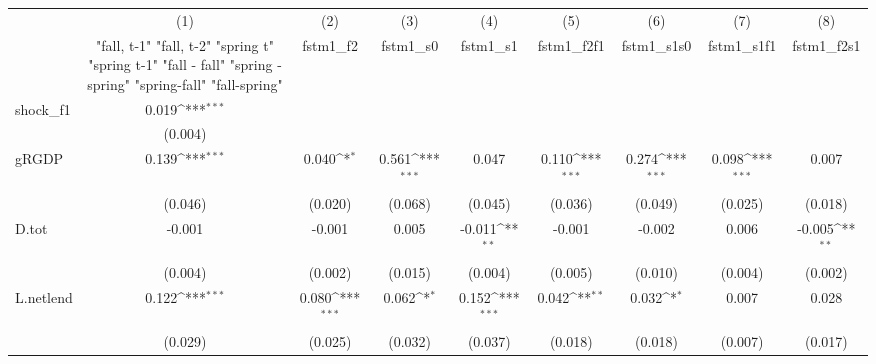 {
\def\sym#1{\ifmmode^{#1}\else\(^{#1}\)\fi}
\begin{tabular}{l*{8}{c}}
\toprule
            &\multicolumn{1}{c}{(1)}&\multicolumn{1}{c}{(2)}&\multicolumn{1}{c}{(3)}&\multicolumn{1}{c}{(4)}&\multicolumn{1}{c}{(5)}&\multicolumn{1}{c}{(6)}&\multicolumn{1}{c}{(7)}&\multicolumn{1}{c}{(8)}\\
            &\multicolumn{1}{c}{  "fall, t-1" "fall, t-2" "spring t" "spring t-1"  "fall - fall" "spring - spring" "spring-fall" "fall-spring" }&\multicolumn{1}{c}{fstm1\_f2}&\multicolumn{1}{c}{fstm1\_s0}&\multicolumn{1}{c}{fstm1\_s1}&\multicolumn{1}{c}{fstm1\_f2f1}&\multicolumn{1}{c}{fstm1\_s1s0}&\multicolumn{1}{c}{fstm1\_s1f1}&\multicolumn{1}{c}{fstm1\_f2s1}\\
\midrule
shock\_f1    &       0.019\sym{***}&                     &                     &                     &                     &                     &                     &                     \\
            &     (0.004)         &                     &                     &                     &                     &                     &                     &                     \\
\addlinespace
gRGDP       &       0.139\sym{***}&       0.040\sym{*}  &       0.561\sym{***}&       0.047         &       0.110\sym{***}&       0.274\sym{***}&       0.098\sym{***}&       0.007         \\
            &     (0.046)         &     (0.020)         &     (0.068)         &     (0.045)         &     (0.036)         &     (0.049)         &     (0.025)         &     (0.018)         \\
\addlinespace
D.tot       &      -0.001         &      -0.001         &       0.005         &      -0.011\sym{**} &      -0.001         &      -0.002         &       0.006         &      -0.005\sym{**} \\
            &     (0.004)         &     (0.002)         &     (0.015)         &     (0.004)         &     (0.005)         &     (0.010)         &     (0.004)         &     (0.002)         \\
\addlinespace
L.netlend   &       0.122\sym{***}&       0.080\sym{***}&       0.062\sym{*}  &       0.152\sym{***}&       0.042\sym{**} &       0.032\sym{*}  &       0.007         &       0.028         \\
            &     (0.029)         &     (0.025)         &     (0.032)         &     (0.037)         &     (0.018)         &     (0.018)         &     (0.007)         &     (0.017)         \\

\end{tabular}}
